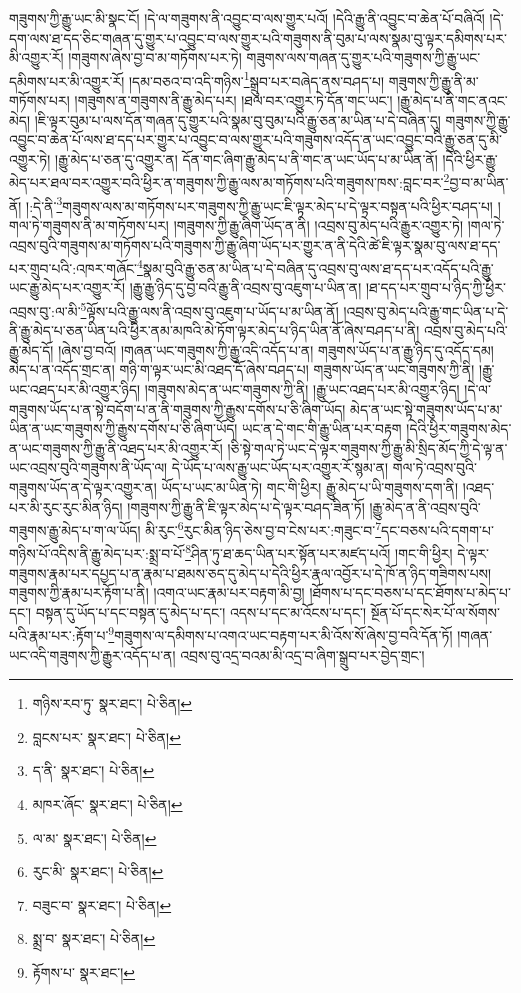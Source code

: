 གཟུགས་ཀྱི་རྒྱུ་ཡང་མི་སྣང་ངོ། །དེ་ལ་གཟུགས་ནི་འབྱུང་བ་ལས་གྱུར་པའོ། །དེའི་རྒྱུ་ནི་འབྱུང་བ་ཆེན་པོ་བཞིའོ། །དེ་དག་ལས་ཐ་དད་ཅིང་གཞན་དུ་གྱུར་པ་འབྱུང་བ་ལས་གྱུར་པའི་གཟུགས་ནི་བུམ་པ་ལས་སྣམ་བུ་ལྟར་དམིགས་པར་མི་འགྱུར་རོ། །གཟུགས་ཞེས་བྱ་བ་མ་གཏོགས་པར་ཏེ། གཟུགས་ལས་གཞན་དུ་གྱུར་པའི་གཟུགས་ཀྱི་རྒྱུ་ཡང་དམིགས་པར་མི་འགྱུར་རོ། །དམ་བཅའ་བ་འདི་གཉིས་\footnote{གཉིས་རབ་ཏུ་  སྣར་ཐང་།  པེ་ཅིན། }སྒྲུབ་པར་བཞེད་ནས་བཤད་པ། གཟུགས་ཀྱི་རྒྱུ་ནི་མ་གཏོགས་པར། །གཟུགས་ན་གཟུགས་ནི་རྒྱུ་མེད་པར། །ཐལ་བར་འགྱུར་ཏེ་དོན་གང་ཡང་། །རྒྱུ་མེད་པ་ནི་གང་ནའང་མེད། །ཇི་ལྟར་བུམ་པ་ལས་དོན་གཞན་དུ་གྱུར་པའི་སྣམ་བུ་བུམ་པའི་རྒྱུ་ཅན་མ་ཡིན་པ་དེ་བཞིན་དུ། གཟུགས་ཀྱི་རྒྱུ་འབྱུང་བ་ཆེན་པོ་ལས་ཐ་དད་པར་གྱུར་པ་འབྱུང་བ་ལས་གྱུར་པའི་གཟུགས་འདོད་ན་ཡང་འབྱུང་བའི་རྒྱུ་ཅན་དུ་མི་འགྱུར་ཏེ། །རྒྱུ་མེད་པ་ཅན་དུ་འགྱུར་ན། དོན་གང་ཞིག་རྒྱུ་མེད་པ་ནི་གང་ན་ཡང་ཡོད་པ་མ་ཡིན་ནོ། །དེའི་ཕྱིར་རྒྱུ་མེད་པར་ཐལ་བར་འགྱུར་བའི་ཕྱིར་ན་གཟུགས་ཀྱི་རྒྱུ་ལས་མ་གཏོགས་པའི་གཟུགས་ཁས་:བླང་བར་\footnote{བླངས་པར་  སྣར་ཐང་།  པེ་ཅིན། }བྱ་བ་མ་ཡིན་ནོ། །:དེ་ནི་\footnote{ད་ནི་  སྣར་ཐང་།  པེ་ཅིན། }གཟུགས་ལས་མ་གཏོགས་པར་གཟུགས་ཀྱི་རྒྱུ་ཡང་ཇི་ལྟར་མེད་པ་དེ་ལྟར་བསྟན་པའི་ཕྱིར་བཤད་པ། །གལ་ཏེ་གཟུགས་ནི་མ་གཏོགས་པར། །གཟུགས་ཀྱི་རྒྱུ་ཞིག་ཡོད་ན་ནི། །འབྲས་བུ་མེད་པའི་རྒྱུར་འགྱུར་ཏེ། །གལ་ཏེ་འབྲས་བུའི་གཟུགས་མ་གཏོགས་པའི་གཟུགས་ཀྱི་རྒྱུ་ཞིག་ཡོད་པར་གྱུར་ན་ནི་དེའི་ཚེ་ཇི་ལྟར་སྣམ་བུ་ལས་ཐ་དད་པར་གྲུབ་པའི་:འཁར་གཞོང་\footnote{མཁར་ཞོང་  སྣར་ཐང་།  པེ་ཅིན། }སྣམ་བུའི་རྒྱུ་ཅན་མ་ཡིན་པ་དེ་བཞིན་དུ་འབྲས་བུ་ལས་ཐ་དད་པར་འདོད་པའི་རྒྱུ་ཡང་རྒྱུ་མེད་པར་འགྱུར་རོ། །རྒྱུ་རྒྱུ་ཉིད་དུ་བྱ་བའི་རྒྱུ་ནི་འབྲས་བུ་འཇུག་པ་ཡིན་ན། །ཐ་དད་པར་གྲུབ་པ་ཉིད་ཀྱི་ཕྱིར་འབྲས་བུ་:ལ་མི་\footnote{ལ་མ་  སྣར་ཐང་།  པེ་ཅིན། }ལྟོས་པའི་རྒྱུ་ལས་ནི་འབྲས་བུ་འཇུག་པ་ཡོད་པ་མ་ཡིན་ནོ། །འབྲས་བུ་མེད་པའི་རྒྱུ་གང་ཡིན་པ་དེ་ནི་རྒྱུ་མེད་པ་ཅན་ཡིན་པའི་ཕྱིར་ནམ་མཁའི་མེ་ཏོག་ལྟར་མེད་པ་ཉིད་ཡིན་ནོ་ཞེས་བཤད་པ་ནི། འབྲས་བུ་མེད་པའི་རྒྱུ་མེད་དོ། །ཞེས་བྱ་བའོ། །གཞན་ཡང་གཟུགས་ཀྱི་རྒྱུ་འདི་འདོད་པ་ན། གཟུགས་ཡོད་པ་ན་རྒྱུ་ཉིད་དུ་འདོད་དམ། མེད་པ་ན་འདོད་གྲང་ན། གཉི་ག་ལྟར་ཡང་མི་འཐད་དོ་ཞེས་བཤད་པ། གཟུགས་ཡོད་ན་ཡང་གཟུགས་ཀྱི་ནི། །རྒྱུ་ཡང་འཐད་པར་མི་འགྱུར་ཉིད། །གཟུགས་མེད་ན་ཡང་གཟུགས་ཀྱི་ནི། །རྒྱུ་ཡང་འཐད་པར་མི་འགྱུར་ཉིད། །དེ་ལ་གཟུགས་ཡོད་པ་ན་སྟེ་བདོག་པ་ན་ནི་གཟུགས་ཀྱི་རྒྱུས་དགོས་པ་ཅི་ཞིག་ཡོད། མེད་ན་ཡང་སྟེ་གཟུགས་ཡོད་པ་མ་ཡིན་ན་ཡང་གཟུགས་ཀྱི་རྒྱུས་དགོས་པ་ཅི་ཞིག་ཡོད། ཡང་ན་དེ་གང་གི་རྒྱུ་ཡིན་པར་བརྟག །དེའི་ཕྱིར་གཟུགས་མེད་ན་ཡང་གཟུགས་ཀྱི་རྒྱུ་ནི་འཐད་པར་མི་འགྱུར་རོ། །ཅི་སྟེ་གལ་ཏེ་ཡང་དེ་ལྟར་གཟུགས་ཀྱི་རྒྱུ་མི་སྲིད་མོད་ཀྱི་དེ་ལྟ་ན་ཡང་འབྲས་བུའི་གཟུགས་ནི་ཡོད་ལ། དེ་ཡོད་པ་ལས་རྒྱུ་ཡང་ཡོད་པར་འགྱུར་རོ་སྙམ་ན། གལ་ཏེ་འབྲས་བུའི་གཟུགས་ཡོད་ན་དེ་ལྟར་འགྱུར་ན། ཡོད་པ་ཡང་མ་ཡིན་ཏེ། གང་གི་ཕྱིར། རྒྱུ་མེད་པ་ཡི་གཟུགས་དག་ནི། །འཐད་པར་མི་རུང་རུང་མིན་ཉིད། །གཟུགས་ཀྱི་རྒྱུ་ནི་ཇི་ལྟར་མེད་པ་དེ་ལྟར་བཤད་ཟིན་ཏོ། །རྒྱུ་མེད་ན་ནི་འབྲས་བུའི་གཟུགས་རྒྱུ་མེད་པ་ག་ལ་ཡོད། མི་རུང་\footnote{རུང་མི་  སྣར་ཐང་།  པེ་ཅིན། }རུང་མིན་ཉིད་ཅེས་བྱ་བ་ངེས་པར་:གཟུང་བ་\footnote{བཟུང་བ་  སྣར་ཐང་།  པེ་ཅིན། }དང་བཅས་པའི་དགག་པ་གཉིས་པོ་འདིས་ནི་རྒྱུ་མེད་པར་:སྨྲ་བ་པོ་\footnote{སྨྲ་བ་  སྣར་ཐང་།  པེ་ཅིན། }ཤིན་ཏུ་ཐ་ཆད་ཡིན་པར་སྟོན་པར་མཛད་པའོ། །གང་གི་ཕྱིར། དེ་ལྟར་གཟུགས་རྣམ་པར་དཔྱད་པ་ན་རྣམ་པ་ཐམས་ཅད་དུ་མེད་པ་དེའི་ཕྱིར་རྣལ་འབྱོར་པ་དེ་ཁོ་ན་ཉིད་གཟིགས་པས། གཟུགས་ཀྱི་རྣམ་པར་རྟོག་པ་ནི། །འགའ་ཡང་རྣམ་པར་བརྟག་མི་བྱ། །ཐོགས་པ་དང་བཅས་པ་དང་ཐོགས་པ་མེད་པ་དང་། བསྟན་དུ་ཡོད་པ་དང་བསྟན་དུ་མེད་པ་དང་། འདས་པ་དང་མ་འོངས་པ་དང་། སྔོན་པོ་དང་སེར་པོ་ལ་སོགས་པའི་རྣམ་པར་:རྟོག་པ་\footnote{རྟོགས་པ་  སྣར་ཐང་། }གཟུགས་ལ་དམིགས་པ་འགའ་ཡང་བརྟག་པར་མི་འོས་སོ་ཞེས་བྱ་བའི་དོན་ཏོ། །གཞན་ཡང་འདི་གཟུགས་ཀྱི་རྒྱུར་འདོད་པ་ན། འབྲས་བུ་འདྲ་བའམ་མི་འདྲ་བ་ཞིག་སྒྲུབ་པར་བྱེད་གྲང་། 